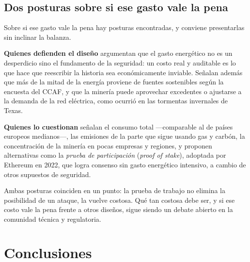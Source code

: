 \documentclass[11pt,a4paper]{article}
\newcommand{\webhint}[1]{}
\begin{document}
\subsection{Dos posturas sobre si ese gasto vale la pena}

Sobre si ese gasto vale la pena hay posturas encontradas, y conviene presentarlas sin inclinar la balanza.

\textbf{Quienes defienden el diseño} argumentan que el gasto energético no es un desperdicio sino el fundamento de la seguridad: un costo real y auditable es lo que hace que reescribir la historia sea económicamente inviable. Señalan además que más de la mitad de la energía proviene de fuentes sostenibles según la encuesta del CCAF, y que la minería puede aprovechar excedentes o ajustarse a la demanda de la red eléctrica, como ocurrió en las tormentas invernales de Texas.

\textbf{Quienes lo cuestionan} señalan el consumo total ---comparable al de países europeos medianos---, las emisiones de la parte que sigue usando gas y carbón, la concentración de la minería en pocas empresas y regiones, y proponen alternativas como la \emph{prueba de participación} (\emph{proof of stake}), adoptada por Ethereum en 2022, que logra consenso sin gasto energético intensivo, a cambio de otros supuestos de seguridad.

Ambas posturas coinciden en un punto: la prueba de trabajo no elimina la posibilidad de un ataque, la vuelve costosa. Qué tan costosa debe ser, y si ese costo vale la pena frente a otros diseños, sigue siendo un debate abierto en la comunidad técnica y regulatoria.

\section{Conclusiones}\label{sec:conclusiones}
\webhint{section; id=sec-conclusiones; slug=conclusiones; kicker=cierre; role=summary}
\end{document}
